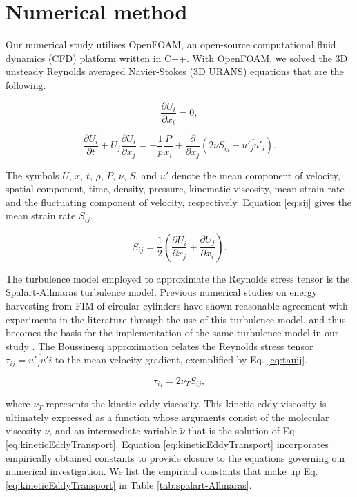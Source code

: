 \documentclass[oneside]{utmthesis}
\begin{document}
\section{Numerical method} \label{sec:numMeth}
Our numerical study utilises OpenFOAM, an open-source computational fluid dynamics (CFD) platform written in C++. With OpenFOAM, we solved the 3D unsteady Reynolds averaged Navier-Stokes (3D URANS) equations that are the following.

\begin{equation}
  \frac{\partial U_{i}}{\partial x_{i}}=0,
  \label{eq:continuity}
\end{equation}

\begin{equation}
  \frac{\partial U_{i}}{\partial t}+U_{j}\frac{\partial U_{i}}{\partial x_{j}} = -\frac{1}{p}\frac{P}{x_{i}}+\frac{\partial}{\partial x_{j}} \left( 2\nu S_{ij}-\overline{u'_{j}u'_{i}} \right).
  \label{eq:navier-stokes}
\end{equation}

The symbols $U$, $x$, $t$, $\rho$, $P$, $\nu$, $S$, and $u'$ denote the mean component of velocity, spatial component, time, density, pressure, kinematic viscosity, mean strain rate and the fluctuating component of velocity, respectively. Equation \ref{eq:sij} gives the mean strain rate $S_{ij}$.

\begin{equation}
  S_{ij} = \frac{1}{2} \left( \frac{\partial U_{i}}{\partial x_{j}} + \frac{\partial U_{j}}{\partial x_{i}} \right).
  \label{eq:sij}
\end{equation}

The turbulence model employed to approximate the Reynolds stress tensor is the Spalart-Allmaras turbulence model. Previous numerical studies on energy harvesting from FIM of circular cylinders have shown reasonable agreement with experiments in the literature through the use of this turbulence model, and thus becomes the basis for the implementation of the same turbulence model in our study \citep{Ding2015a,Ding2015b}. The Boussinesq approximation relates the Reynolds stress tensor $\tau_{ij} = \overline{u'_{j}u'{i}}$ to the mean velocity gradient, exemplified by Eq. \ref{eq:tauij}.

\begin{equation}
  \tau_{ij} = 2 \nu_{T}S_{ij},
  \label{eq:tauij}
\end{equation}

\noindent where $\nu_{T}$ represents the kinetic eddy viscosity. This kinetic eddy viscosity is ultimately expressed as a function whose arguments consist of the molecular viscosity $\nu$, and an intermediate variable $\tilde{\nu}$ that is the solution of Eq. \ref{eq:kineticEddyTransport}. Equation \ref{eq:kineticEddyTransport} incorporates empirically obtained constants to provide closure to the equations governing our numerical investigation. We list the empirical constants that make up Eq. \ref{eq:kineticEddyTransport} in Table \ref{tab:spalart-Allmaras}.
\end{document}

